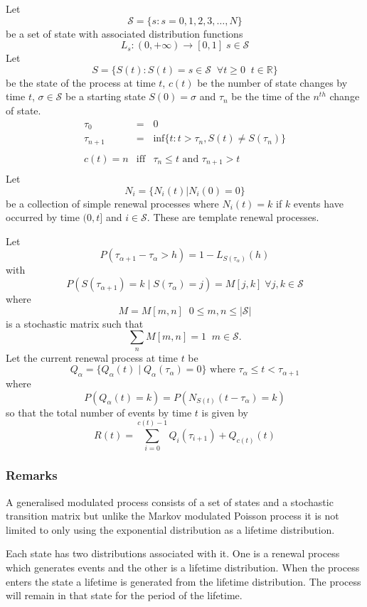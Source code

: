 Let
\[ {\mathcal S} = \{s : s = 0,1,2,3,\ldots, N \} \]
be a set of state with associated distribution functions
\[
L_s : (0, +\infty) \rightarrow [0,1] \; s \in {\mathcal S}
\]
Let
\[
S = \{ S(t) : S(t) = s \in {\mathcal S} \; \; \forall t \geq 0 \; \; t \in {\mathbb R} \}
\]
be the state of the process at time $t$, $c(t)$ be the number of state
changes by time $t$, $\sigma \in {\mathcal S}$ be a starting state $S(0) =
\sigma$ and $\tau_n$ be the time of the $n^{th}$ change of state.
\[
\begin{array}{rcl}
\tau_0 & = & 0 \\
\tau_{n+1} & = & \mbox{inf}\{t : t > \tau_n, S(t) \neq S(\tau_n) \} \\
\\
c(t) = n & \mbox{iff} & \tau_n  \leq t \mbox{ and } \tau_{n+1} > t \\
\end{array}
\]
Let
\[ N_i = \{N_i(t) | N_i(0) = 0 \} \]
be a collection of simple renewal processes where $N_i(t) = k$ if $k$
events have occurred by time $(0,t]$ and $i \in {\mathcal S}$.  These are
template renewal processes.

Let
\[
P(\tau_{\alpha + 1} - \tau_\alpha > h) = 1 - L_{S(\tau_\alpha)}(h)
\]
with
\[
P(S(\tau_{\alpha + 1}) = k \;| \; S(\tau_\alpha) = j) = M[j,k] \; \forall j,k \in {\mathcal S}
\]
where
\[
M = M[m,n] \; \; 0 \leq m , n \leq |{\mathcal S}|
\]
is a stochastic matrix such that
\[
\sum_n M[m,n] = 1 \; \;  m \in {\mathcal S}.
\]
Let the current renewal process at time $t$ be
\[
Q_\alpha = \{Q_\alpha(t) \;| \; Q_\alpha(\tau_\alpha) = 0\} \mbox{ where } \tau_{\alpha} \leq t < \tau_{\alpha + 1}
\]
where
\[
P(Q_{\alpha}(t) = k) = P(N_{S(t)}(t - \tau_\alpha) = k)
\]
so that the total number of events by time $t$ is given by
\[
R(t) = \sum^{c(t)-1}_{i=0}{Q_i(\tau_{i+1})} + Q_{c(t)}(t)
\]
\subsubsection{Remarks}

A generalised modulated process consists of a set of states and a
stochastic transition matrix but unlike the Markov modulated Poisson
process it is not limited to only using the exponential distribution
as a lifetime distribution.

Each state has two distributions associated with it.  One is a renewal
process which generates events and the other is a lifetime
distribution.  When the process enters the state a lifetime is
generated from the lifetime distribution.  The process will remain in
that state for the period of the lifetime.

